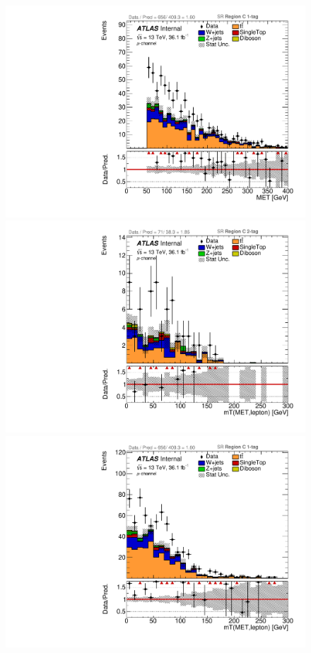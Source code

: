 \begin{figure}[!htbp]
\begin{center}
\includegraphics[scale=0.23]{./figures/boosted/ABCD/muon_SR_RegionC_1tag_MET}\\
\includegraphics[scale=0.23]{./figures/boosted/ABCD/muon_SR_RegionC_WlepMtATLAS}
\includegraphics[scale=0.23]{./figures/boosted/ABCD/muon_SR_RegionC_1tag_WlepMtATLAS}\\

\end{center}
\end{figure}
